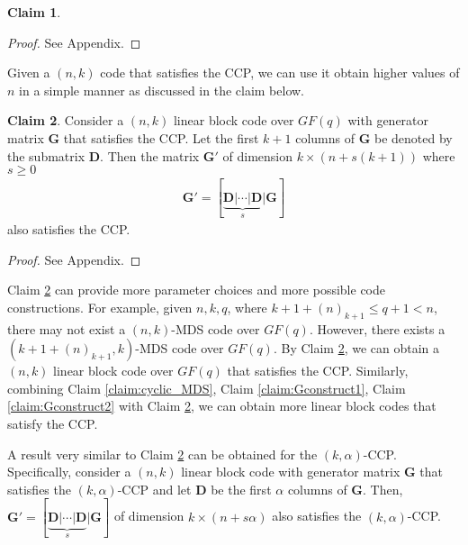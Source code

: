 \documentclass[journal,twocolumn]{IEEEtran}
\theoremstyle{definition}
\newtheorem{claim}{Claim}
\newcommand{\calA}{\mathcal{A}}
\newcommand{\bfG}{\mathbf{G}}
\newcommand{\bfD}{\mathbf{D}}
\newcommand{\aditya}[1]{\marginpar{+}{\bf Aditya's remark}: {\em #1}}
\newcommand{\litang}[1]{\marginpar{+}{\bf Li's remark}: {\em #1}}
\begin{document}
\begin{claim}
\end{claim}
\begin{proof}
	See Appendix.
\end{proof}


Given a $(n,k)$ code that satisfies the CCP, we can use it obtain higher values of $n$ in a simple manner as discussed in the claim below.
\begin{claim}
	\label{claim:matrixextend}
	Consider a $(n,k)$ linear block code over $GF(q)$ with generator matrix $\bfG$ that satisfies the CCP. Let the first $k+1$ columns of $\bfG$ be denoted by the submatrix $\bfD$. Then the matrix $\bfG'$ of dimension $k \times (n + s(k+1))$ where $s\ge 0$
	\begin{align*}
	\bfG'=[\underbrace{\bfD| \cdots |\bfD}_s| \bfG]
	\end{align*}
also satisfies the CCP.
\end{claim}
\begin{proof}
	See Appendix.
\end{proof}

Claim \ref{claim:matrixextend} can provide more parameter choices and more possible code constructions. For example, given $n,k,q$, where $k+1+(n)_{k+1}\le q+1<n$, there may not exist a $(n, k)$-MDS code over $GF(q)$. However, there exists a $(k+1+(n)_{k+1}, k)$-MDS code over $GF(q)$. By Claim \ref{claim:matrixextend}, we can obtain a $(n,k)$ linear block code over $GF(q)$ that satisfies the CCP. Similarly, combining Claim \ref{claim:cyclic_MDS}, Claim \ref{claim:Gconstruct1}, Claim \ref{claim:Gconstruct2} with Claim \ref{claim:matrixextend}, we can obtain more linear block codes that satisfy the CCP. %


A result very similar to Claim \ref{claim:matrixextend} can be obtained for the $(k,\alpha)$-CCP. Specifically, consider a $(n,k)$ linear block code with generator matrix $\bfG$ that satisfies the $(k,\alpha)$-CCP and let $\bfD$ be the first $\alpha$ columns of $\bfG$. Then, $\bfG'=[\underbrace{\bfD| \cdots |\bfD}_s| \bfG]$ of dimension $k\times (n+s\alpha)$ also satisfies the $(k,\alpha)$-CCP.%

\end{document}

